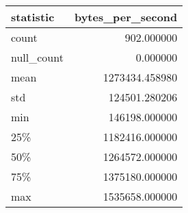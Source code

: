 \begin{tabular}{lr}
    \toprule
    statistic & bytes\_per\_second \\
    \midrule
    count & 902.000000 \\
    null\_count & 0.000000 \\
    mean & 1273434.458980 \\
    std & 124501.280206 \\
    min & 146198.000000 \\
    25\% & 1182416.000000 \\
    50\% & 1264572.000000 \\
    75\% & 1375180.000000 \\
    max & 1535658.000000 \\
    \bottomrule
\end{tabular}
